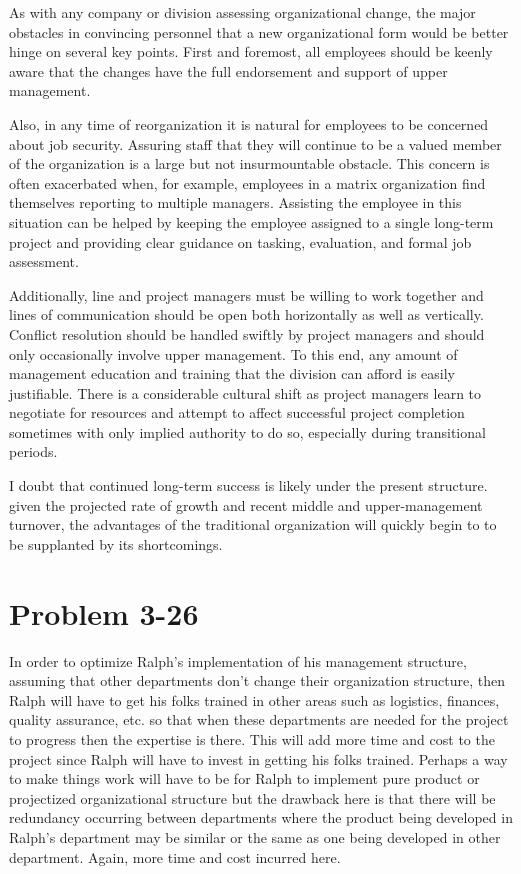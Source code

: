 \documentclass[letterpaper,10pt]{article}
\begin{document}
As with any company or division assessing organizational change, the major obstacles in convincing personnel that a new organizational form would be better hinge on several key points.  First and foremost, all employees should be keenly aware that the changes have the full endorsement and support of upper management.

Also, in any time of reorganization it is natural for employees to be concerned about job security.  Assuring staff that they will continue to be a valued member of the organization is a large but not insurmountable obstacle. This concern is often exacerbated when, for example, employees in a matrix organization find themselves reporting to multiple managers.  Assisting the employee in this situation can be helped by keeping the employee assigned to a single long-term project and providing clear guidance on tasking, evaluation, and formal job assessment.

Additionally, line and project managers must be willing to work together and lines of communication should be open both horizontally as well as vertically.  Conflict resolution should be handled swiftly by project managers and should only occasionally involve upper management.  To this end, any amount of management education and training that the division can afford is easily justifiable.  There is a considerable cultural shift as project managers learn to negotiate for resources and attempt to affect successful project completion sometimes with only implied authority to do so, especially during transitional periods.

I doubt that continued long-term success is likely under the present structure.  given the projected rate of growth and recent middle and upper-management turnover, the advantages of the traditional organization will quickly begin to to be supplanted by its shortcomings.

\section*{Problem 3-26}
In order to optimize Ralph's implementation of his management structure, assuming that other departments don't change their organization structure, then Ralph will have to get his folks trained in other areas such as logistics, finances, quality assurance, etc. so that when these departments are needed for the project to progress then the expertise is there. This will add more time and cost to the project since Ralph will have to invest in getting his folks trained. Perhaps a way to make things work will have to be for Ralph to implement pure product or projectized organizational structure but the drawback here is that there will be redundancy occurring between departments where the product being developed in Ralph's department may be similar or the same as one being developed in other department. Again, more time and cost incurred here. 
\end{document}
